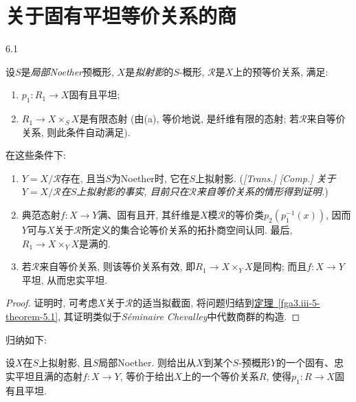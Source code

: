\chapter{关于固有平坦等价关系的商}\thispagestyle{fancy}\label{fga3.iii-6}
\begin{theorem}{6.1}\label{fga3.iii-6-theorem-6.1}\skipsinglepar
\par{}设\(S\)是\emph{局部Noether}预概形, \(X\)是\emph{拟射影}的\(S\)-概形, \(\mathcal {R}\)是\(X\)上的预等价关系, 满足: 
\begin{enumerate}
      
 \item[a.]\(p_1\colon  R_1\to  X\)固有且平坦;

      
 \item[b.]\(R_1\to  X\times _S X\)是有限态射 (由(a), 等价地说, 是纤维有限的态射; 若\(\mathcal {R}\)来自等价关系, 则此条件自动满足).

    
\end{enumerate} 在这些条件下: 
\begin{enumerate}
      
 \item[i.]\(Y=X/\mathcal {R}\)存在, 且当\(S\)为Noether时, 它在\(S\)上拟射影. (\emph{[Trans.] \emph{[Comp.]} 关于\(Y=X/\mathcal {R}\)在\(S\)上拟射影的事实, 目前只在\(\mathcal {R}\)来自等价关系的情形得到证明.})

      
 \item[ii.]典范态射\(f\colon  X\to  Y\)满、固有且开, 其纤维是\(X\)模\(\mathcal {R}\)的等价类\(p_2(p_1^{-1}(x))\), 因而\(Y\)可与\(X\)关于\(\mathcal {R}\)所定义的集合论等价关系的拓扑商空间认同. 最后, \(R_1\to  X\times _Y X\)是满的.

      
 \item[iii.]若\(\mathcal {R}\)来自等价关系, 则该等价关系有效, 即\(R_1\to  X\times _Y X\)是同构; 而且\(f\colon  X\to  Y\)平坦, 从而忠实平坦.

    
\end{enumerate}
\begin{proof}
\par{}证明时, 可考虑\(X\)关于\(\mathcal {R}\)的适当拟截面, 将问题归结到\hyperref[fga3.iii-5-theorem-5.1]{定理~\ref*{fga3.iii-5-theorem-5.1}}, 其证明类似于\emph{Séminaire Chevalley}中代数商群的构造.
\end{proof}
\end{theorem}
\par{}归纳如下:
\begin{scholium}{}\label{fga3.iii-6-scholium}\skipsinglepar
\par{}设\(X\)在\(S\)上拟射影, 且\(S\)局部Noether. 则给出从\(X\)到某个\(S\)-预概形\(Y\)的一个固有、忠实平坦且满的态射\(f\colon  X\to  Y\), 等价于给出\(X\)上的一个等价关系\(R\), 使得\(p_1\colon  R\to  X\)固有且平坦.
\end{scholium}
